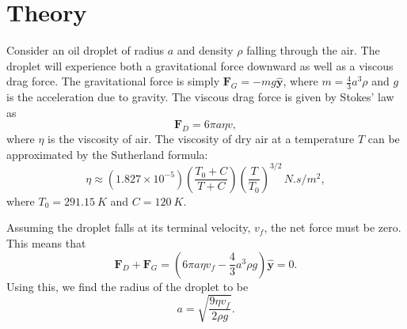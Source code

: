 \documentclass[aps, reprint,amsmath,amssymb]{revtex4-1} %
\renewcommand{\vec}[1]{\mathbf{#1}}
\newcommand{\y}{\vec{\hat{y}}}
\begin{document}
\section{Theory}



Consider an oil droplet of radius $a$ and density $\rho$ falling through
the air. The droplet will experience both a gravitational force downward as
well as a viscous drag force. The gravitational force is simply $\vec{F}_G =
-mg\y$, where $m = \frac{4}{3}a^3 \rho$ and $g$ is the acceleration due to
gravity. The viscous drag force is given by Stokes' law as
\begin{equation}
    \vec{F}_D = 6\pi a \eta v,
\end{equation}
where $\eta$ is the viscosity of air. The viscosity of dry air at a
temperature $T$ can be approximated by the Sutherland formula:
\begin{equation}
    \eta \approx (1.827\times 10^{-5}) \left( \frac{T_0 + C}{T + C} \right)
    \left( \frac{T}{T_0} \right)^{3/2}\, \si{N.s/m^2},
\end{equation}
where $T_0 = \SI{291.15}{K}$ and $C = \SI{120}{K}$. 

Assuming the droplet falls at its terminal velocity, $v_f$, the net force must be
zero. This means that
\begin{equation}\label{eq:noE_balance}
    \vec{F}_D + \vec{F}_G = \left(6\pi a \eta v_f - \frac{4}{3} a^3 \rho g\right)\y = 0.
\end{equation}
Using this, we find the radius of the droplet to be
\begin{equation}\label{eq:radius}
    a = \sqrt{\frac{9\eta v_f}{2\rho g}}.
\end{equation}
\end{document}
